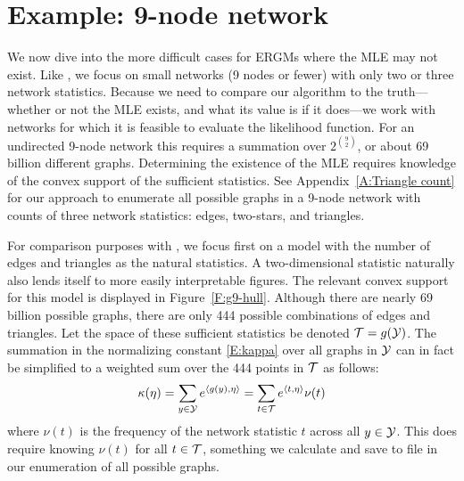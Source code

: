
\section{Example: 9-node network} \label{S:Example:9node}
We now dive into the more difficult cases for ERGMs where the MLE may not exist.
Like \citet{Handcock:degeneracy, Rinaldo:2009}, we focus on small networks (9 nodes or 
fewer) with only two or three network statistics.  
Because we need to compare our algorithm to the truth---whether or not the MLE exists, 
and what its value
is if it does---we work with networks for which it is feasible to evaluate the likelihood
function.  For an undirected 9-node network this requires a summation over  $2^{{9\choose 2}}$, or about 69 billion different graphs.  Determining the existence of the MLE
requires knowledge of the convex support of the sufficient statistics.  See Appendix~\ref{A:Triangle count} for our approach to enumerate all possible graphs in a 9-node network with counts of three network statistics: edges, two-stars, and triangles.


For comparison purposes with \citet{Rinaldo:2009}, we focus first on a model with the number 
of edges and triangles as the natural statistics.  A two-dimensional statistic 
naturally also lends itself to more easily interpretable figures.  The relevant convex support for this model is displayed in Figure~\ref{F:g9-hull}.  Although there are nearly 69 billion
possible graphs, there are only 444 possible combinations of edges and triangles.
Let the space of these sufficient statistics be denoted ${\mathcal T} = g({\mathcal Y})$.
The summation in the normalizing constant \eqref{E:kappa} over all graphs in ${\mathcal Y}$ can in fact be simplified
 to a weighted sum over the 444 points in ${\mathcal T}$ as follows:
\begin{align*}
	\kappa(\eta) = \sum_{y \in {\mathcal Y}} e^{\langle g(y),\eta \rangle } = 	\sum_{t \in {\mathcal T}} e^{\langle t,\eta \rangle } \nu(t)
\end{align*}
where $\nu(t)$ is the frequency of the network statistic $t$ across all $y \in {\mathcal Y}$.  
This does require knowing $\nu(t)$ for all $t \in {\mathcal T}$, something we calculate
and save to file in our enumeration of all possible graphs.

